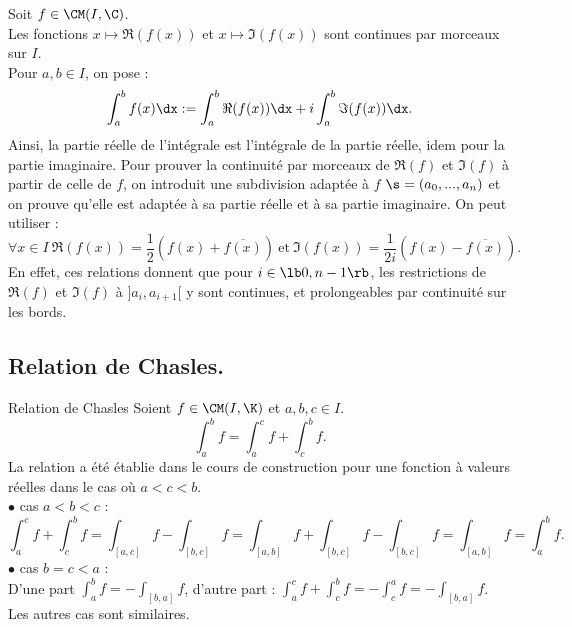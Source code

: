 \documentclass[11pt]{article}
\begin{document}
\begin{prop}{}{}
    Soit $f\in\CM(I,\C)$.\\
    Les fonctions $x\mapsto\Re(f(x))$ et $x\mapsto\Im(f(x))$ sont continues par morceaux sur $I$.\\
    Pour $a,b\in I$, on pose :
    \begin{equation*}
        \int_a^bf(x)\dx:=\int_a^b\Re(f(x))\dx+i\int_a^b\Im(f(x))\dx.
    \end{equation*}
    Ainsi, la partie réelle de l'intégrale est l'intégrale de la partie réelle, idem pour la partie imaginaire.
    \tcblower
    Pour prouver la continuité par morceaux de $\Re(f)$ et $\Im(f)$ à partir de celle de $f$, on introduit une subdivision adaptée à $f$ $\s=(a_0,...,a_n)$ et on prouve qu'elle est adaptée à sa partie réelle et à sa partie imaginaire. On peut utiliser :
    \begin{equation*}
        \forall x\in I ~ \Re(f(x)) = \frac{1}{2}(f(x)+\overline{f(x)}) ~ \text{et} ~ \Im(f(x))=\frac{1}{2i}(f(x)-\overline{f(x)}).
    \end{equation*}
    En effet, ces relations donnent que pour $i\in\lb0,n-1\rb$, les restrictions de $\Re(f)$ et $\Im(f)$ à $]a_i,a_{i+1}[$ y sont continues, et prolongeables par continuité sur les bords.
\end{prop}

\subsection{Relation de Chasles.}
\begin{prop}{Relation de Chasles}{}
    Soient $f\in\CM(I,\K)$ et $a,b,c\in I$.
    \begin{equation*}
        \int_a^bf=\int_a^cf+\int_c^bf.
    \end{equation*}
    \tcblower
    La relation a été établie dans le cours de construction pour une fonction à valeurs réelles dans le cas où $a<c<b$.\\
    $\bullet$ cas $a<b<c$ :
    \begin{equation*}
        \int_a^cf+\int_c^bf=\int_{[a,c]}f-\int_{[b,c]}f=\int_{[a,b]}f+\int_{[b,c]}f-\int_{[b,c]}f=\int_{[a,b]}f=\int_a^bf.
    \end{equation*}
    $\bullet$ cas $b=c<a$ :\\
    D'une part $\int_a^bf=-\int_{[b,a]}f$, d'autre part : $\int_a^cf+\int_c^bf=-\int_c^af=-\int_[b,a]f$.\n
    Les autres cas sont similaires.
\end{prop}
\end{document}
